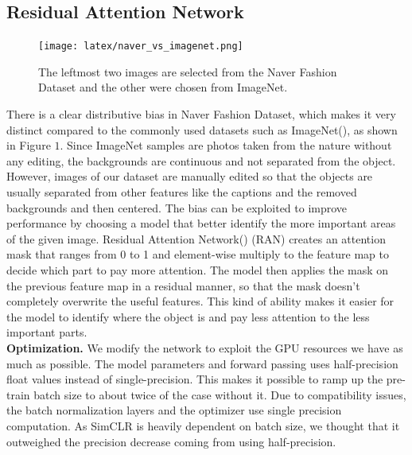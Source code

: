 \documentclass[10pt,twocolumn,letterpaper]{article}
\begin{document}
	\subsection{Residual Attention Network}
	\begin{figure}
		\centering
		\texttt{[image: latex/naver\_vs\_imagenet.png]}
		\label{fig:datasetcomparison}
		\caption{The leftmost two images are selected from the Naver Fashion Dataset and the other were chosen from ImageNet.}
	\end{figure}
	
	There is a clear distributive bias in Naver Fashion Dataset, which makes it very distinct compared to the commonly used datasets such as ImageNet(\cite{ILSVRC15}), as shown in Figure $1$. Since ImageNet samples are photos taken from the nature without any editing, the backgrounds are continuous and not separated from the object. However, images of our dataset are manually edited so that the objects are usually separated from other features like the captions and the removed backgrounds and then centered. The bias can be exploited to improve performance by choosing a model that better identify the more important areas of the given image. Residual Attention Network(\cite{RAN}) (RAN) creates an attention mask that ranges from 0 to 1 and element-wise multiply to the feature map to decide which part to pay more attention. The model then applies the mask on the previous feature map in a residual manner, so that the mask doesn't completely overwrite the useful features. This kind of ability makes it easier for the model to identify where the object is and pay less attention to the less important parts.\\
	
	\textbf{Optimization.} We modify the network to exploit the GPU resources we have as much as possible. The model parameters and forward passing uses half-precision float values instead of single-precision. This makes it possible to ramp up the pre-train batch size to about twice of the case without it. Due to compatibility issues, the batch normalization layers and the optimizer use single precision computation. As SimCLR is heavily dependent on batch size\cite{CKNH20}, we thought that it outweighed the precision decrease coming from using half-precision.
	
	
\end{document}
